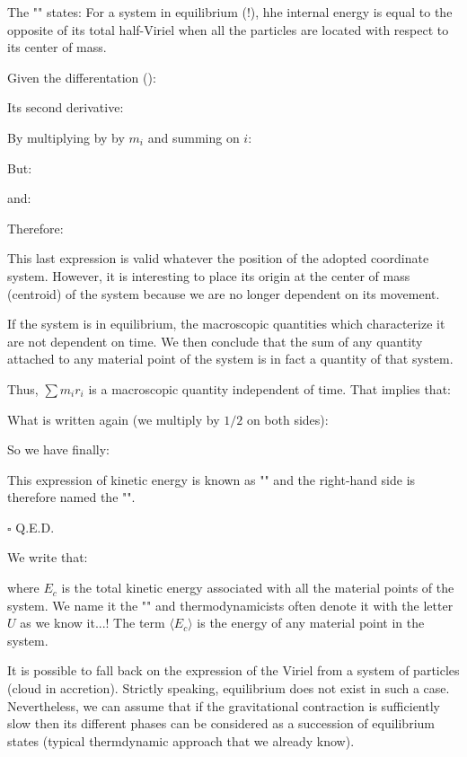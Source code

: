 	The "" states: For a system in equilibrium (!), hhe internal energy is equal to the opposite of its total half-Viriel when all the particles are located with respect to its center of mass.
	\begin{dem}
	Given the differentation ():
	
	Its second derivative:
	
	By multiplying by by $m_i$ and summing on $i$:
	
	But:
	
	and:
	
	Therefore:
	
	This last expression is valid whatever the position of the adopted coordinate system. However, it is interesting to place its origin at the center of mass (centroid) of the system because we are no longer dependent on its movement.

	If the system is in equilibrium, the macroscopic quantities which characterize it are not dependent on time. We then conclude that the sum of any quantity attached to any material point of the system is in fact a quantity of that system.

	Thus, $\sum m_ir_i$ is a macroscopic quantity independent of time. That implies that:
	
	What is written again (we multiply by $1/2$ on both sides):
	
	So we have finally:
	
	This expression of kinetic energy is known as "" and the right-hand side is therefore named the "".
	\begin{flushright}
		$\square$  Q.E.D.
	\end{flushright}
	\end{dem}
	We write that:
	
	where $E_c$ is the total kinetic energy associated with all the material points of the system. We name it the "" and thermodynamicists often denote it with the letter $U$ as we know it...! The term $\langle E_c \rangle$ is the energy of any material point in the system.

	It is possible to fall back on the expression of the Viriel from a system of particles (cloud in accretion). Strictly speaking, equilibrium does not exist in such a case. Nevertheless, we can assume that if the gravitational contraction is sufficiently slow then its different phases can be considered as a succession of equilibrium states (typical thermdynamic approach that we already know).

